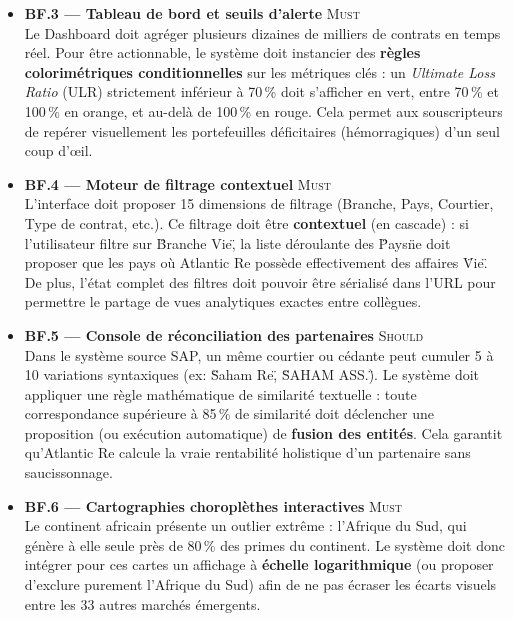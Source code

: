 \documentclass[12pt,a4paper]{report}
\begin{document}
\begin{itemize}[leftmargin=1.5cm, itemsep=5pt]
  \item \textbf{BF.3 --- Tableau de bord et seuils d'alerte} \hfill \textsc{Must} \\ Le Dashboard doit agréger plusieurs dizaines de milliers de contrats en temps réel. Pour être actionnable, le système doit instancier des \textbf{règles colorimétriques conditionnelles} sur les métriques clés : un \textit{Ultimate Loss Ratio} (ULR) strictement inférieur à 70\,\% doit s'afficher en vert, entre 70\,\% et 100\,\% en orange, et au-delà de 100\,\% en rouge. Cela permet aux souscripteurs de repérer visuellement les portefeuilles déficitaires (hémorragiques) d'un seul coup d'œil.
  
  \item \textbf{BF.4 --- Moteur de filtrage contextuel} \hfill \textsc{Must} \\ L'interface doit proposer 15 dimensions de filtrage (Branche, Pays, Courtier, Type de contrat, etc.). Ce filtrage doit être \textbf{contextuel} (en cascade) : si l'utilisateur filtre sur \"Branche Vie\", la liste déroulante des \"Pays\" ne doit proposer que les pays où Atlantic Re possède effectivement des affaires \"Vie\". De plus, l'état complet des filtres doit pouvoir être sérialisé dans l'URL pour permettre le partage de vues analytiques exactes entre collègues.
  
  \item \textbf{BF.5 --- Console de réconciliation des partenaires} \hfill \textsc{Should} \\ Dans le système source SAP, un même courtier ou cédante peut cumuler 5 à 10 variations syntaxiques (ex: \"Saham Re\", \"SAHAM ASS.\"). Le système doit appliquer une règle mathématique de similarité textuelle : toute correspondance supérieure à 85\,\% de similarité doit déclencher une proposition (ou exécution automatique) de \textbf{fusion des entités}. Cela garantit qu'Atlantic Re calcule la vraie rentabilité holistique d'un partenaire sans saucissonnage.
  
  \item \textbf{BF.6 --- Cartographies choroplèthes interactives} \hfill \textsc{Must} \\ Le continent africain présente un outlier extrême : l'Afrique du Sud, qui génère à elle seule près de 80\,\% des primes du continent. Le système doit donc intégrer pour ces cartes un affichage à \textbf{échelle logarithmique} (ou proposer d'exclure purement l'Afrique du Sud) afin de ne pas écraser les écarts visuels entre les 33 autres marchés émergents.
  

\end{itemize}
\end{document}

